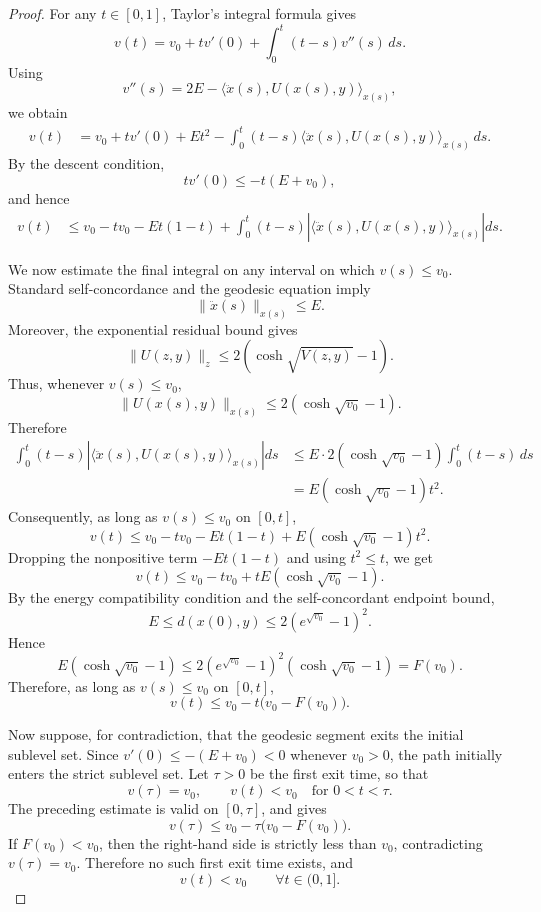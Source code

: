 \documentclass[11pt]{article}
\begin{document}
\begin{proof}
For any \(t\in[0,1]\), Taylor's integral formula gives
\[
    v(t)
    =
    v_0+t v'(0)+\int_0^t(t-s)v''(s)\,ds.
\]
Using
\[
    v''(s)
    =
    2E-\langle \ddot x(s),U(x(s),y)\rangle_{x(s)},
\]
we obtain
\[
\begin{aligned}
    v(t)
    &=
    v_0+t v'(0)+E t^2
    -
    \int_0^t(t-s)
    \langle \ddot x(s),U(x(s),y)\rangle_{x(s)}\,ds.
\end{aligned}
\]
By the descent condition,
\[
    t v'(0)\le -t(E+v_0),
\]
and hence
\[
\begin{aligned}
    v(t)
    &\le
    v_0-tv_0-Et(1-t)
    +
    \int_0^t(t-s)
    \left|
    \langle \ddot x(s),U(x(s),y)\rangle_{x(s)}
    \right|ds.
\end{aligned}
\]

We now estimate the final integral on any interval on which
\(v(s)\le v_0\).  Standard self-concordance and the geodesic equation imply
\[
    \|\ddot x(s)\|_{x(s)}\le E.
\]
Moreover, the exponential residual bound gives
\[
    \|U(z,y)\|_z
    \le
    2\left(\cosh\sqrt{V(z,y)}-1\right).
\]
Thus, whenever \(v(s)\le v_0\),
\[
    \|U(x(s),y)\|_{x(s)}
    \le
    2\left(\cosh\sqrt{v_0}-1\right).
\]
Therefore
\[
\begin{aligned}
    \int_0^t(t-s)
    \left|
    \langle \ddot x(s),U(x(s),y)\rangle_{x(s)}
    \right|ds
    &\le
    E\cdot 2\left(\cosh\sqrt{v_0}-1\right)
    \int_0^t(t-s)\,ds  \\
    &=
    E\left(\cosh\sqrt{v_0}-1\right)t^2.
\end{aligned}
\]
Consequently, as long as \(v(s)\le v_0\) on \([0,t]\),
\[
    v(t)
    \le
    v_0-tv_0-Et(1-t)
    +
    E\left(\cosh\sqrt{v_0}-1\right)t^2.
\]
Dropping the nonpositive term \(-Et(1-t)\) and using \(t^2\le t\), we get
\[
    v(t)
    \le
    v_0
    -
    t v_0
    +
    tE\left(\cosh\sqrt{v_0}-1\right).
\]
By the energy compatibility condition and the self-concordant endpoint bound,
\[
    E\le d(x(0),y)
    \le
    2(e^{\sqrt{v_0}}-1)^2.
\]
Hence
\[
    E\left(\cosh\sqrt{v_0}-1\right)
    \le
    2(e^{\sqrt{v_0}}-1)^2(\cosh\sqrt{v_0}-1)
    =
    F(v_0).
\]
Therefore, as long as \(v(s)\le v_0\) on \([0,t]\),
\[
    v(t)
    \le
    v_0-t\bigl(v_0-F(v_0)\bigr).
\]

Now suppose, for contradiction, that the geodesic segment exits the initial
sublevel set. Since \(v'(0)\le -(E+v_0)<0\) whenever \(v_0>0\), the path
initially enters the strict sublevel set. Let \(\tau>0\) be the first exit
time, so that
\[
    v(\tau)=v_0,
    \qquad
    v(t)<v_0 \quad \text{for }0<t<\tau.
\]
The preceding estimate is valid on \([0,\tau]\), and gives
\[
    v(\tau)
    \le
    v_0-\tau\bigl(v_0-F(v_0)\bigr).
\]
If \(F(v_0)<v_0\), then the right-hand side is strictly less than \(v_0\),
contradicting \(v(\tau)=v_0\). Therefore no such first exit time exists, and
\[
    v(t)<v_0
    \qquad
    \forall t\in(0,1].
\]
\end{proof}
\end{document}
